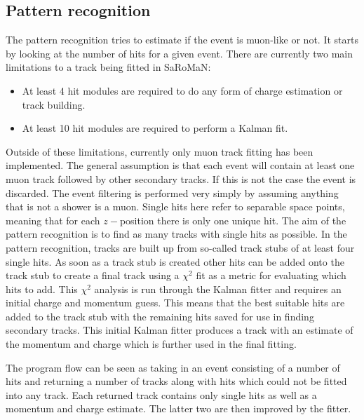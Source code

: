 \subsection{Pattern recognition}
The pattern recognition tries to estimate if the event is muon-like or not. It starts by looking at the number of hits for a given event. There are currently two main limitations to a track being fitted in SaRoMaN:
\begin{itemize}
\item At least 4 hit modules are required to do any form of charge estimation or track building.
\item At least 10 hit modules are required to perform a Kalman fit.
\end{itemize}
Outside of these limitations, currently only muon track fitting has been implemented. The general assumption is that each event will contain at least one muon track followed by other secondary tracks. If this is not the case the event is discarded. The event filtering is performed very simply by assuming anything that is not a shower is a muon. Single hits here refer to separable space points, meaning that for each $z-$position there is only one unique hit. The aim of the pattern recognition is to find as many tracks with single hits as possible. In the pattern recognition, tracks are built up from so-called track stubs of at least four single hits. As soon as a track stub is created other hits can be added onto the track stub to create a final track using a $\chi^2$ fit as a metric for evaluating which hits to add. This $\chi^2$ analysis is run through the Kalman fitter and requires an initial charge and momentum guess. This means that the best suitable hits are added to the track stub with the remaining hits saved for use in finding secondary tracks. This initial Kalman fitter produces a track with an estimate of the momentum and charge which is further used in the final fitting.

The program flow can be seen as taking in an event consisting of a number of hits and returning a number of tracks along with hits which could not be fitted into any track. Each returned track contains only single hits as well as a momentum and charge estimate. The latter two are then improved by the fitter.


